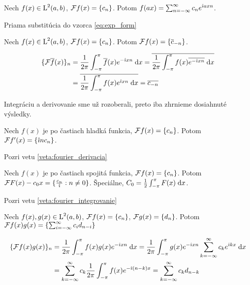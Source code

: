 \begin{veta}
Nech $f(x) \in \mbox{L}^2(a,b)$, $\mathcal{F}{f(x)} = \{c_n\}$. Potom
$f(a x) = \sum_{n=-\infty}^{\infty} c_n e^{\hat{\imath} a x n}$.
\end{veta}
\begin{dokaz}
Priama substitúcia do vzorca \ref{eq:exp_form}
\end{dokaz}


\begin{veta}[Konjugácia]
Nech $f(x) \in \mbox{L}^2(a,b)$, $\mathcal{F}{f(x)} = \{c_n\}$. Potom
$\mathcal{F} f(x) = \{ \overline{c}_{-n} \}$.
\end{veta}
\begin{dokaz}
    \begin{equation*}
    \begin{split}
      \{\mathcal{F} \overline{f}(x)\}_n &= 
        \frac{1}{2\pi} \int_{-\pi}^{\pi} \overline{f}(x) e^{-\hat{\imath} x n} \; \mathrm{d} x 
        = \overline{  \frac{1}{2\pi} \int_{-\pi}^{\pi} f(x) \overline{e^{-\hat{\imath} x n}}
            \; \mathrm{d} x} \\
        &= \overline{  \frac{1}{2\pi} \int_{-\pi}^{\pi} f(x) e^{\hat{\imath} x n}
            \; \mathrm{d} x} 
        = \overline{c_{-n}}
    \end{split}
    \end{equation*}
\end{dokaz}

Integráciu a derivovanie sme už rozoberali, preto iba zhrnieme
dosiahnuté výsledky.
\begin{veta}[O derivovaní]
Nech $f(x)$ je po častiach hladká funkcia, $\mathcal{F}{f(x)} =
\{c_n\}$. Potom $\mathcal{F}{f'(x)} = \{ \hat{\imath} n c_n \}$.
\end{veta}
\begin{dokaz}
    Pozri vetu \ref{veta:fourier_derivacia}
\end{dokaz}

\begin{veta}[O integrovaní]
Nech $f(x)$ je po častiach spojitá funkcia, $\mathcal{F}{f(x)} =
\{c_n\}$. Potom $\mathcal{F}{F(x)-c_0 x} = \{ \frac{c_n}{\hat{\imath}} : n\not=0\}$.
Špeciálne, $C_0 = \frac{1}{2} \int_{-\pi}^{\pi} F(x) \; \mathrm{d} x$.
\end{veta}
\begin{dokaz}
    Pozri vetu \ref{veta:fourier_integrovanie}
\end{dokaz}

\begin{veta}[O modulácii]
Nech $f(x),g(x) \in \mbox{L}^2(a,b)$, $\mathcal{F}{f(x)} = \{c_n\}$,
$\mathcal{F}{g(x)} = \{d_n\}$. Potom
$\mathcal{F} f(x)g(x) = \{ \sum_{i=-\infty}^{\infty} c_i d_{n-i} \}$
\end{veta}
\begin{dokaz}
    \begin{equation*}
    \begin{split}
      \{\mathcal{F} f(x)g(x)\}_n &= 
        \frac{1}{2\pi} \int_{-\pi}^{\pi} f(x)g(x) e^{-\hat{\imath} x n} \; \mathrm{d} x 
        = \frac{1}{2\pi} \int_{-\pi}^{\pi} g(x) e^{-\hat{\imath} x n} \sum_{k=-\infty}^{\infty} c_k
        e^{\hat{\imath} k x} \; \mathrm{d} x \\
        &= \sum_{k=-\infty}^{\infty} c_k \frac{1}{2\pi} \int_{-\pi}^{\pi} f(x) e^{-\hat{\imath} (n-k)
        x}
        = \sum_{k=-\infty}^{\infty} c_k d_{n-k}
    \end{split}
    \end{equation*}
\end{dokaz}

